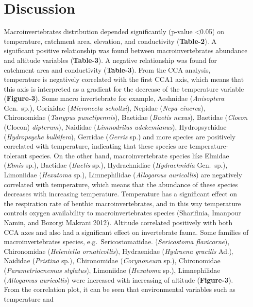\documentclass[
]{article}
\begin{document}
\hypertarget{discussion}{%
\section{Discussion}\label{discussion}}

Macroinvertebrates distribution depended significantly (p-value
\textless0.05) on temperature, catchment area, elevation, and
conductivity (\textbf{Table-2}). A significant positive relationship was
found between macroinvertebrates abundance and altitude variables
(\textbf{Table-3}). A negative relationship was found for catchment area
and conductivity (\textbf{Table-3}). From the CCA analysis, temperature
is negatively correlated with the first CCA1 axis, which means that this
axis is interpreted as a gradient for the decrease of the temperature
variable (\textbf{Figure-3}). Some macro invertebrate for example,
Aeshnidae (\emph{Anisoptera} Gen.~sp.), Corixidae (\emph{Micronecta
scholtzi}), Nepidae (\emph{Nepa cinerea}), Chironomidae (\emph{Tanypus
punctipennis}), Baetidae (\emph{Baetis nexus}), Baetidae (\emph{Cloeon}
(Cloeon) \emph{dipterum}), Naididae (\emph{Limnodrilus udekemianus}),
Hydropsychidae (\emph{Hydropsyche bulbifera}), Gerridae (\emph{Gerris}
sp.) and more species are positively correlated with temperature,
indicating that these species are temperature-tolerant species. On the
other hand, macroinvertebrate species like Elmidae (\emph{Elmis} sp.),
Baetidae (\emph{Baetis} sp.), Hydrachnidiae (\emph{Hydrachnidia}
Gen.~sp.), Limoniidae (\emph{Hexatoma} sp.), Limnephilidae
(\emph{Allogamus auricollis}) are negatively correlated with
temperature, which means that the abundance of these species decreases
with increasing temperature. Temperature has a significant effect on the
respiration rate of benthic macroinvertebrates, and in this way
temperature controls oxygen availability to macroinvertebrates species
(Sharifinia, Imanpour Namin, and Bozorgi Makrani 2012). Altitude
correlated positively with both CCA axes and also had a significant
effect on invertebrate fauna. Some families of macroinvertebrates
species, e.g.~Sericostomatidae. (\emph{Sericostoma flavicorne}),
Chironomidae (\emph{Heleniella ornaticollis}), Hydraenidae
(\emph{Hydraena gracilis} Ad.), Naididae (\emph{Pristina} sp.),
Chironomidae (\emph{Corynoneura} sp.), Chironomidae
(\emph{Parametriocnemus stylatus}), Limoniidae (\emph{Hexatoma} sp.),
Limnephilidae (\emph{Allogamus auricollis}) were increased with
increasing of altitude (\textbf{Figure-3}). From the correlation plot,
it can be seen that environmental variables such as temperature and
\end{document}
